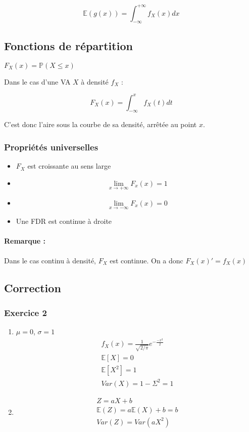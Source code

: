 \documentclass{article}
\begin{document}
$$\mathbb{E}(g(x)) = \int_{- \infty}^{+ \infty} f_{X}(x)dx $$

\subsection{Fonctions de répartition}

$F_{X}(x) = \mathbb{P}(X \leq x)$

Dans le cas d'une VA $X$ à densité $f_{X}$ :

$$F_{X}(x) = \int_{- \infty}^{x} f_{X}(t)dt $$

C'est donc l'aire sous la courbe de sa densité, arrêtée au point $x$.

\subsubsection{Propriétés universelles}

\begin{itemize}
  \item $F_{X}$ est croissante au sens large
  \item $$ \lim_{x \to + \infty} F_{x}(x) = 1 $$
  \item $$ \lim_{x \to - \infty} F_{x}(x) = 0 $$
  \item Une FDR est continue à droite
\end{itemize}

\paragraph{Remarque :} Dans le cas continu à densité, $F_{X}$ est continue.
On a donc $F_{X}(x)' = f_{X}(x)$

\subsection{Correction}

\subsubsection{Exercice 2}

\begin{enumerate}
  \item $\mu = 0$, $\sigma = 1$
  \begin{align*} f_{X}(x) = \frac{1}{\sqrt{2/\pi}}e^{-\frac{-x^2}{2}} \\
    \mathbb{E}[X] = 0 \\
    \mathbb{E}[X^2] = 1 \\
    \textit{Var}(X) = 1 - \Sigma^{2} = 1
  \end{align*}
  \item \begin{align*}
    Z = aX + b \\
    \mathbb{E}(Z) = a\mathbb{E}(X)+b = b \\
    \textit{Var}(Z) = \textit{Var}(aX^2)
  \end{align*}
\end{enumerate}
\end{document}
